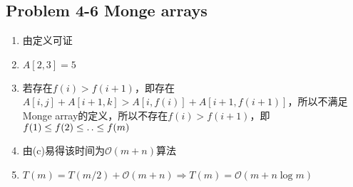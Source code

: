 \subsection*{Problem 4-6 Monge arrays}
\begin{enumerate}
	\item	由定义可证
	\item	$A[2,3]=5$
	\item	若存在$f(i) > f(i + 1)$，即存在$A[i, j] + A[i + 1, k] > A[i, f(i)] + A[i + 1, f(i + 1)]$，所以不满足Monge array的定义，所以不存在$f(i) > f(i + 1)$，即$f(1) \leq f(2) \leq \mathinner{\ldotp\ldotp} \leq f(m)$
	\item	由(c)易得该时间为$\mathcal{O}(m + n)$算法
	\item	$T(m)=T(m/2)+\mathcal{O}(m + n) \Rightarrow T(m)=\mathcal{O}(m + n \log m)$
\end{enumerate}

